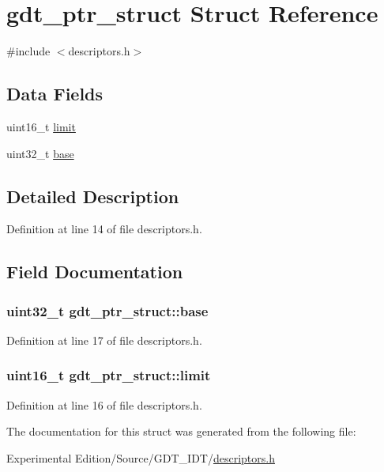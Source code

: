 \hypertarget{structgdt__ptr__struct}{}\section{gdt\+\_\+ptr\+\_\+struct Struct Reference}
\label{structgdt__ptr__struct}


{\ttfamily \#include $<$descriptors.\+h$>$}

\subsection*{Data Fields}
\begin{DoxyCompactItemize}
\item 
uint16\+\_\+t \hyperlink{structgdt__ptr__struct_abf557ff0ca1cf3e130e8ab0086ab4ce6}{limit}
\item 
uint32\+\_\+t \hyperlink{structgdt__ptr__struct_a9b351f31bc261f3c2c3a87252350fb9c}{base}
\end{DoxyCompactItemize}


\subsection{Detailed Description}


Definition at line 14 of file descriptors.\+h.



\subsection{Field Documentation}
\subsubsection[{\texorpdfstring{base}{base}}]{\setlength{\rightskip}{0pt plus 5cm}uint32\+\_\+t gdt\+\_\+ptr\+\_\+struct\+::base}\hypertarget{structgdt__ptr__struct_a9b351f31bc261f3c2c3a87252350fb9c}{}\label{structgdt__ptr__struct_a9b351f31bc261f3c2c3a87252350fb9c}


Definition at line 17 of file descriptors.\+h.

\subsubsection[{\texorpdfstring{limit}{limit}}]{\setlength{\rightskip}{0pt plus 5cm}uint16\+\_\+t gdt\+\_\+ptr\+\_\+struct\+::limit}\hypertarget{structgdt__ptr__struct_abf557ff0ca1cf3e130e8ab0086ab4ce6}{}\label{structgdt__ptr__struct_abf557ff0ca1cf3e130e8ab0086ab4ce6}


Definition at line 16 of file descriptors.\+h.



The documentation for this struct was generated from the following file\+:\begin{DoxyCompactItemize}
\item 
Experimental Edition/\+Source/\+G\+D\+T\+\_\+\+I\+D\+T/\hyperlink{descriptors_8h}{descriptors.\+h}\end{DoxyCompactItemize}
